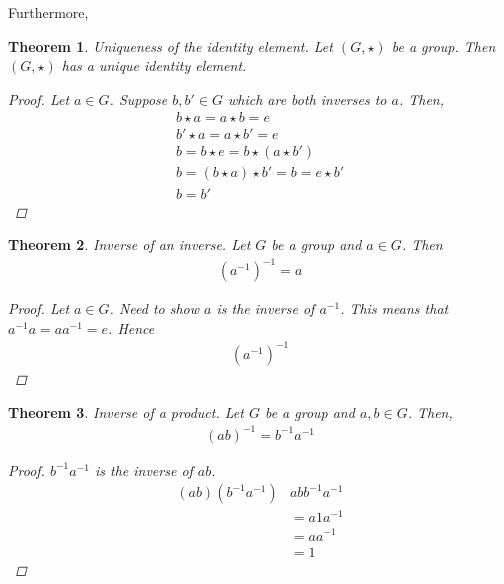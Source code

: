 \documentclass[a4paper]{article}
\theoremstyle{plain}
\newtheorem{thm}{Theorem}[section]
\theoremstyle{definition}
\theoremstyle{remark}
\begin{document}
Furthermore,
\begin{thm}
	Uniqueness of the identity element. Let $(G, \star)$ be a group. Then $(G, \star)$ has a unique identity element. 
	\begin{proof}
		Let $a \in G$. Suppose $b,b' \in G$ which are both inverses to $a$. Then,
		\begin{align*}
			b \star a = a \star b = e \\
			b' \star a = a \star b' = e \\
			b = b \star e = b \star (a \star b') \\
			b = (b\star a) \star b' = b = e \star b'\\
			b = b'
		\end{align*}
	\end{proof}
		
\end{thm}
\begin{thm}
	Inverse of an inverse. Let $G$ be a group and $a \in G$. Then
	\begin{align*}
		(a^{-1})^{-1} = a
	\end{align*}
	\begin{proof}
		Let $a \in G$. Need to show $a$ is the inverse of $a^{-1}$. This means that $a^{-1}a = aa^{-1}=e$. Hence
		\begin{align*}
			(a^{-1})^{-1}
		\end{align*}
	\end{proof}
\end{thm}
\begin{thm}
	Inverse of a product. Let $G$ be a group and $a,b \in G$. Then,
	\begin{align*}
		(ab)^{-1} = b^{-1}a^{-1}
	\end{align*}
	\begin{proof}
		$b^{-1}a^{-1}$ is the inverse of $ab$.
		\begin{align*}
			(ab)(b^{-1}a^{-1}) & abb^{-1}a^{-1} \\
					   &=a 1 a^{-1}\\
					   &= aa^{-1} \\
					   &= 1 
		\end{align*}
	\end{proof}
\end{thm}
\end{document}

